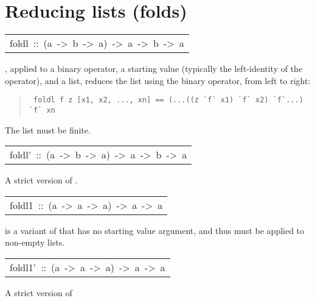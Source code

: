 \section{Reducing lists (folds)
}
\begin{haddockdesc}
\item[\begin{tabular}{@{}l}
foldl\ ::\ (a\ ->\ b\ ->\ a)\ ->\ a\ ->\ {\char 91}b{\char 93}\ ->\ a
\end{tabular}]\haddockbegindoc
{}, applied to a binary operator, a starting value (typically
 the left-identity of the operator), and a list, reduces the list
 using the binary operator, from left to right:
\par
\begin{quote}
{\haddockverb\begin{verbatim}
 foldl f z [x1, x2, ..., xn] == (...((z `f` x1) `f` x2) `f`...) `f` xn
\end{verbatim}}
\end{quote}
The list must be finite.
\par

\end{haddockdesc}
\begin{haddockdesc}
\item[\begin{tabular}{@{}l}
foldl'\ ::\ (a\ ->\ b\ ->\ a)\ ->\ a\ ->\ {\char 91}b{\char 93}\ ->\ a
\end{tabular}]\haddockbegindoc
A strict version of .
\par

\end{haddockdesc}
\begin{haddockdesc}
\item[\begin{tabular}{@{}l}
foldl1\ ::\ (a\ ->\ a\ ->\ a)\ ->\ {\char 91}a{\char 93}\ ->\ a
\end{tabular}]\haddockbegindoc
{} is a variant of  that has no starting value argument,
 and thus must be applied to non-empty lists.
\par

\end{haddockdesc}
\begin{haddockdesc}
\item[\begin{tabular}{@{}l}
foldl1'\ ::\ (a\ ->\ a\ ->\ a)\ ->\ {\char 91}a{\char 93}\ ->\ a
\end{tabular}]\haddockbegindoc
A strict version of 
\par

\end{haddockdesc}

